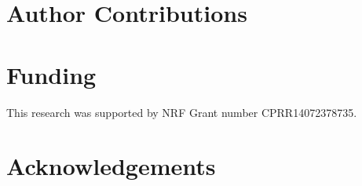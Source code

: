 \documentclass[utf8]{frontiersSCNS}
\begin{document}
\section*{Author Contributions}


\section*{Funding}
This research was supported by NRF Grant number CPRR14072378735.


\section*{Acknowledgements}









\end{document}

